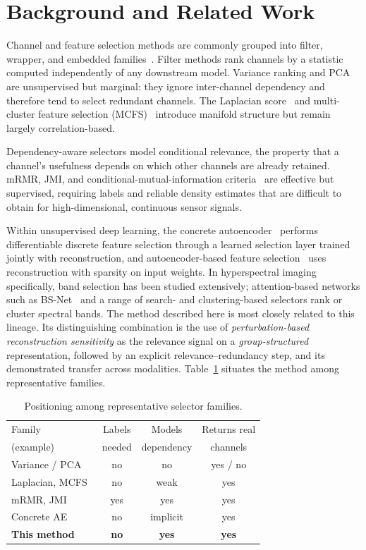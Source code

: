 \documentclass[conference]{IEEEtran}
\begin{document}
\section{Background and Related Work}
Channel and feature selection methods are commonly grouped into filter, wrapper,
and embedded families~\cite{ref_lapscore,ref_mcfs}. Filter methods rank channels
by a statistic computed independently of any downstream model. Variance ranking
and PCA are unsupervised but marginal: they ignore inter-channel dependency and
therefore tend to select redundant channels. The Laplacian
score~\cite{ref_lapscore} and multi-cluster feature selection
(MCFS)~\cite{ref_mcfs} introduce manifold structure but remain largely
correlation-based.

Dependency-aware selectors model conditional relevance, the property that a
channel's usefulness depends on which other channels are already retained. mRMR,
JMI, and conditional-mutual-information criteria~\cite{ref_mrmr,ref_jmi} are
effective but supervised, requiring labels and reliable density estimates that
are difficult to obtain for high-dimensional, continuous sensor signals.

Within unsupervised deep learning, the concrete
autoencoder~\cite{ref_concrete} performs differentiable discrete feature
selection through a learned selection layer trained jointly with reconstruction,
and autoencoder-based feature selection~\cite{ref_aefs} uses reconstruction with
sparsity on input weights. In hyperspectral imaging specifically, band selection
has been studied extensively; attention-based networks such as
BS-Net~\cite{ref_bsnet} and a range of search- and clustering-based selectors
rank or cluster spectral bands. The method described here is most closely related
to this lineage. Its distinguishing combination is the use of
\emph{perturbation-based reconstruction sensitivity} as the relevance signal on a
\emph{group-structured} representation, followed by an explicit
relevance--redundancy step, and its demonstrated transfer across modalities.
Table~\ref{tab:positioning} situates the method among representative families.

\begin{table}[t]
\caption{Positioning among representative selector families.}
\label{tab:positioning}
\centering
\footnotesize
\begin{tabular}{@{}lccc@{}}
\toprule
Family & Labels & Models & Returns real \\
(example) & needed & dependency & channels \\
\midrule
Variance / PCA & no & no & yes / no \\
Laplacian, MCFS~\cite{ref_lapscore,ref_mcfs} & no & weak & yes \\
mRMR, JMI~\cite{ref_mrmr,ref_jmi} & yes & yes & yes \\
Concrete AE~\cite{ref_concrete} & no & implicit & yes \\
\textbf{This method} & \textbf{no} & \textbf{yes} & \textbf{yes} \\
\bottomrule
\end{tabular}
\end{table}
\end{document}
